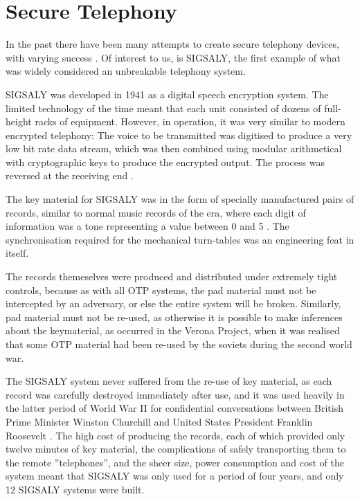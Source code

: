 
\section{Secure Telephony}
\label{chap2sec6}

	In the past there have been many attempts to create secure telephony devices, with varying success \cite{RN30}.
        Of interest to us, is SIGSALY, the first example of what was widely considered an unbreakable telephony system.
        
	SIGSALY was developed in 1941 as a digital speech encryption system.
        The limited technology of the time meant that each unit consisted of dozens of full-height racks of equipment.
        However, in operation, it was very similar to modern encrypted telephony:
        The voice to be transmitted was digitised to produce a very low bit rate data stream, which was then combined using modular arithmetical with cryptographic keys to produce the encrypted output. The process was reversed at the receiving end \cite{bennett1983secret,RN21}.

        The key material for SIGSALY was in the form of specially manufactured pairs of records, similar to normal music records of the era, where each digit of information was a tone representing a value between 0 and 5 \cite{bennett1983secret}.  The synchronisation required for the mechanical turn-tables was an engineering feat in itself.
        
        The records themeselves were produced and distributed under extremely tight controls, because as with all OTP systems, the pad material must not be intercepted by an adversary, or else the entire system will be broken.
        Similarly, pad material must not be re-used, as otherwise it is possible to make inferences about the keymaterial, as occurred in the Verona Project, when it was realised that some OTP material had been re-used by the soviets during the second world war\cite{cohen1997venona,mcgrew2002counter}.

        The SIGSALY system never suffered from the re-use of key material, as each record was carefully destroyed immediately after use,
        and it was used heavily in the latter period of World War II for confidential conversations between British Prime Minister Winston Churchill and United States President Franklin Roosevelt \cite{RN21}.
        The high cost of producing the records, each of which provided only twelve minutes of key material, the complications of safely transporting them to the remote ''telephones'', and the sheer size, power consumption and cost of the system meant that SIGSALY was only used for a period of four years, and only 12 SIGSALY systems were built\cite{RN21}.
    
